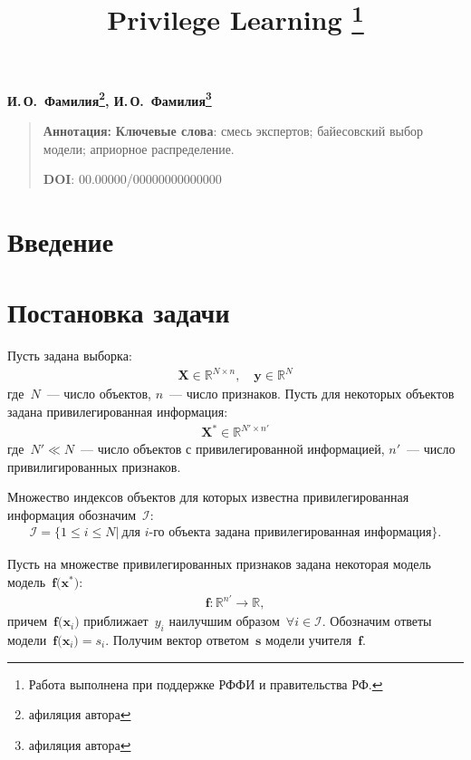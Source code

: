 \documentclass[12pt, twoside]{article}
\numberwithin{equation}{section}
\begin{document}
\title{\bf Privilege Learning \thanks{Работа выполнена при поддержке РФФИ и правительства РФ.}}
\date{}
\author{}
\maketitle

\begin{center}
\bf
И.\,О.~Фамилия\footnote{афиляция автора}, И.\,О.~Фамилия\footnote{афиляция автора}

\end{center}

{\centering\begin{quote}
\textbf{Аннотация:} 
\smallskip
\textbf{Ключевые слова}: смесь экспертов; байесовский выбор модели; априорное распределение.

\smallskip
\textbf{DOI}: 00.00000/00000000000000
\end{quote}
}

\section{Введение}
\section{Постановка задачи}
Пусть задана выборка:
\[
\label{eq:st:1}
\begin{aligned}
\textbf{X} \in \mathbb{R}^{N\times n}, \quad \textbf{y} \in \mathbb{R}^{N}
\end{aligned}
\]
где~$N$~--- число объектов, $n$~--- число признаков.
Пусть для некоторых объектов задана привилегированная информация:
\[
\label{eq:st:2}
\begin{aligned}
\textbf{X}^* \in \mathbb{R}^{N'\times n'}
\end{aligned}
\]
где~$N'\ll N$~--- число объектов с привилегированной информацией, $n'$~--- число привилигированных признаков.

Множество индексов объектов для которых известна привилегированная информация обозначим~$\mathcal{I}$:
\[
\label{eq:st:3}
\begin{aligned}
\mathcal{I} = \{1 \leq i \leq N |~\text{для $i$-го объекта задана привилегированная информация}\}.
\end{aligned}
\]

Пусть на множестве привилегированных признаков задана некоторая модель модель~$\textbf{f}\bigr(\textbf{x}^*\bigr)$:
\[
\label{eq:st:4}
\begin{aligned}
\textbf{f}:\mathbb{R}^{n'} \to \mathbb{R},
\end{aligned}
\]
причем~$\textbf{f}\bigr(\textbf{x}_i\bigr)$ приближает~$y_i$ наилучшим образом~$\forall i \in \mathcal{I}$. Обозначим ответы модели~$\textbf{f}\bigr(\textbf{x}_i\bigr)=s_i$.  Получим вектор ответом~$\textbf{s}$ модели учителя~$\textbf{f}$.
\end{document}
